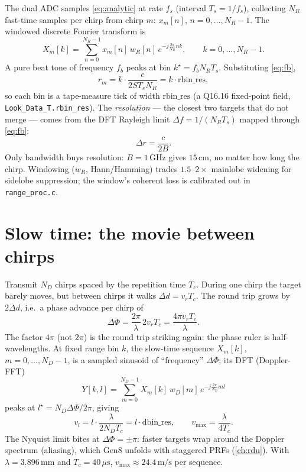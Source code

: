 \documentclass[11pt,oneside]{book}
\begin{document}
The dual ADC samples \cref{eq:analytic} at rate $f_s$ (interval
$T_s=1/f_s$), collecting $N_R$ fast-time samples per chirp from chirp $m$:
$x_m[n]$, $n=0,\dots,N_R-1$. The windowed discrete Fourier transform is
\begin{equation}
X_m[k] = \sum_{n=0}^{N_R-1} x_m[n]\,w_R[n]\,e^{-j\frac{2\pi}{N_R}nk},
\qquad k=0,\dots,N_R-1.
\label{eq:range-fft}
\end{equation}
A pure beat tone of frequency $f_b$ peaks at bin
$k^\star=f_bN_RT_s$. Substituting \cref{eq:fb},
\begin{equation}
r_m = k\cdot\frac{c}{2ST_sN_R} = k\cdot\mathrm{rbin\_res},
\label{eq:rbin}
\end{equation}
so each bin is a tape-measure tick of width $\mathrm{rbin\_res}$ (a Q16.16
fixed-point field, \texttt{Look\_Data\_T.rbin\_res}). The \emph{resolution}
--- the closest two targets that do not merge --- comes from the DFT
Rayleigh limit $\Delta f=1/(N_RT_s)$ mapped through \cref{eq:fb}:
\begin{equation}
\boxed{\Delta r = \frac{c}{2B}.}
\label{eq:range-res}
\end{equation}
Only bandwidth buys resolution: $B=1\,\mathrm{GHz}$ gives $15\,\mathrm{cm}$,
no matter how long the chirp. Windowing ($w_R$, Hann/Hamming) trades
$1.5$--$2\times$ mainlobe widening for sidelobe suppression; the window's
coherent loss is calibrated out in \texttt{range\_proc.c}.

\section{Slow time: the movie between chirps}
\label{sec:slow-time}

Transmit $N_D$ chirps spaced by the repetition time $T_c$. During one chirp
the target barely moves, but between chirps it walks
$\Delta d=v_rT_c$. The round trip grows by $2\Delta d$, i.e.\ a phase
advance per chirp of
\begin{equation}
\boxed{\Delta\Phi = \frac{2\pi}{\lambda}\,2v_rT_c
      = \frac{4\pi v_rT_c}{\lambda}.}
\label{eq:slow-phase}
\end{equation}
The factor $4\pi$ (not $2\pi$) is the round trip striking again: the phase
ruler is half-wavelengths. At fixed range bin $k$, the slow-time sequence
$X_m[k]$, $m=0,\dots,N_D-1$, is a sampled sinusoid of ``frequency''
$\Delta\Phi$; its DFT (Doppler-FFT)
\begin{equation}
Y[k,l] = \sum_{m=0}^{N_D-1} X_m[k]\,w_D[m]\,e^{-j\frac{2\pi}{N_D}ml}
\label{eq:doppler-fft}
\end{equation}
peaks at $l^\star=N_D\Delta\Phi/2\pi$, giving
\begin{equation}
v_l = l\cdot\frac{\lambda}{2N_DT_c} = l\cdot\mathrm{dbin\_res},
\qquad
\boxed{v_{\max} = \frac{\lambda}{4T_c}.}
\label{eq:vmax}
\end{equation}
The Nyquist limit bites at $\Delta\Phi=\pm\pi$: faster targets wrap around
the Doppler spectrum (aliasing), which Gen8 unfolds with staggered PRFs
(\cref{ch:rdu}). With $\lambda=3.896\,\mathrm{mm}$ and
$T_c=40\,\mu\mathrm{s}$, $v_{\max}\approx24.4\,\mathrm{m/s}$ per sequence.
\end{document}
